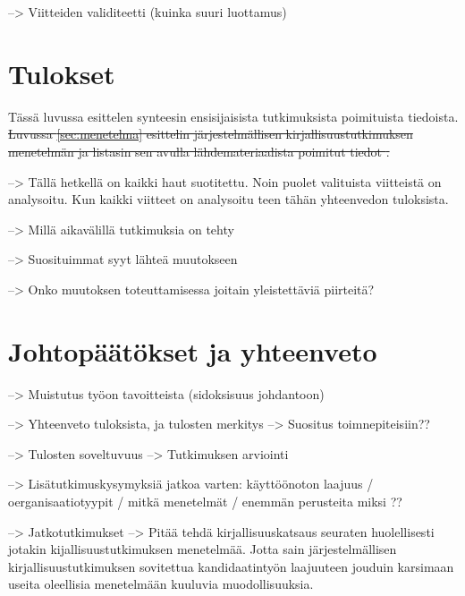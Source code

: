 --> Viitteiden validiteetti (kuinka suuri luottamus)


\section{Tulokset}
\label{sec:tulokset}

Tässä luvussa esittelen synteesin ensisijaisista tutkimuksista poimituista
tiedoista. \sout{Luvussa \ref{sec:menetelma} esittelin järjestelmällisen
kirjallisuustutkimuksen menetelmän ja listasin sen avulla lähdemateriaalista
poimitut tiedot \citep{Kitchenham2007}.}

--> Tällä hetkellä on kaikki haut suotitettu. Noin puolet valituista viitteistä
on analysoitu. Kun kaikki viitteet on analysoitu teen tähän yhteenvedon
tuloksista.

--> Millä aikavälillä tutkimuksia on tehty

--> Suosituimmat syyt lähteä muutokseen

--> Onko muutoksen toteuttamisessa joitain yleistettäviä piirteitä?


\section{Johtopäätökset ja yhteenveto}
\label{sec:johtopaatokset}

--> Muistutus työon tavoitteista (sidoksisuus johdantoon)

--> Yhteenveto tuloksista, ja tulosten merkitys
--> Suositus toimnepiteisiin??

--> Tulosten soveltuvuus
--> Tutkimuksen arviointi

--> Lisätutkimuskysymyksiä jatkoa varten: käyttöönoton laajuus /
oerganisaatiotyypit / mitkä menetelmät / enemmän perusteita miksi ?? 

--> Jatkotutkimukset
--> Pitää tehdä kirjallisuuskatsaus seuraten huolellisesti jotakin
kijallisuustutkimuksen menetelmää. Jotta sain järjestelmällisen
kirjallisuustutkimuksen sovitettua kandidaatintyön laajuuteen jouduin
karsimaan useita oleellisia menetelmään kuuluvia muodollisuuksia.


